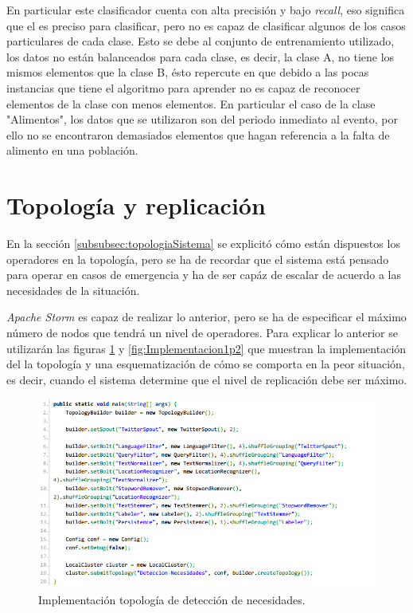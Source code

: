 En particular este clasificador cuenta con alta precisión y bajo \textit{recall}, eso significa que el es preciso para clasificar, pero no es capaz de clasificar algunos de los casos particulares de cada clase. Esto se debe al conjunto de entrenamiento utilizado, los datos no están balanceados para cada clase, es decir, la clase A, no tiene los mismos elementos que la clase B, ésto repercute en que debido a las pocas instancias que tiene el algoritmo para aprender no es capaz de reconocer elementos de la clase con menos elementos. En particular el caso de la clase "Alimentos", los datos que se utilizaron son del periodo inmediato al evento, por ello no se encontraron demasiados elementos que hagan referencia a la falta de alimento en una población.

\section{Topología y replicación}
\label{sec:topYPar}

En la sección \ref{subsubsec:topologiaSistema} se explicitó cómo están dispuestos los operadores en la topología, pero se ha de recordar que el sistema está pensado para operar en casos de emergencia y ha de ser capáz de escalar de acuerdo a las necesidades de la situación.

\textit{Apache Storm} es capaz de realizar lo anterior, pero se ha de especificar el máximo número de nodos que tendrá un nivel de operadores. Para explicar lo anterior se utilizarán las figuras \ref{fig:Implementacion1} y \ref{fig:Implementacion1p2} que muestran la implementación del la topología y una esquematización de cómo se comporta en la peor situación, es decir, cuando el sistema determine que el nivel de replicación debe ser máximo.

\begin{figure}[H]
	\centering
	\captionsetup{justification=centering}
	\includegraphics[scale=0.8]{images/ImplementacionTopologia1.png}
	\caption[Implementación topología de detección de necesidades.]{Implementación topología de detección de necesidades.}
	\label{fig:Implementacion1}
\end{figure}

